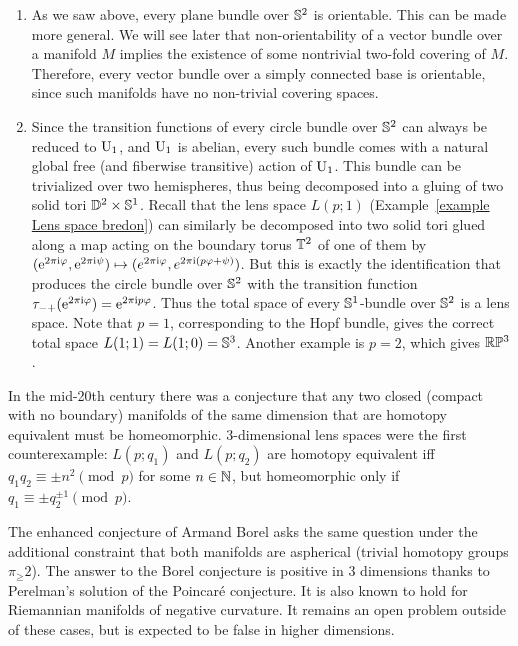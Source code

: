 \begin{example}\label{ex circle bundles over S2}
     \begin{enumerate}
        \item As we saw above, every plane bundle over $\mathbb{S}^2$ is orientable. This can be made more general. We will see later that non-orientability of a vector bundle over a manifold $M$ implies the existence of some nontrivial two-fold covering of $M$. Therefore, every vector bundle over a simply connected base is orientable, since such manifolds have no non-trivial covering spaces.
        
        \item Since the transition functions of every circle bundle over $\mathbb{S}^2$ can always be reduced to $\operatorname{U}_1$, and $\operatorname{U}_1$ is abelian, every such bundle comes with a natural global free (and fiberwise transitive) action of $\operatorname{U}_1$. This bundle can be trivialized over two hemispheres, thus being decomposed into a gluing of two solid tori $\mathbb{D}^2\times \mathbb{S}^1$. Recall that the lens space $L(p;1)$ (Example~\ref{example Lens space bredon}) can similarly be decomposed into two solid tori glued along a map acting on the boundary torus $\mathbb{T}^2$ of one of them by $(\mathrm{e}^{2\pi\mathrm{i} \varphi},\mathrm{e}^{2\pi\mathrm{i}\psi})\mapsto (e^{2\pi\mathrm{i}\varphi},e^{2\pi\mathrm{i}(p\varphi+\psi)})$. But this is exactly the identification that produces the circle bundle over $\mathbb{S}^2$ with the transition function $\tau_{-+}(\mathrm{e}^{2\pi\mathrm{i}\varphi})=\mathrm{e}^{2\pi\mathrm{i} p\varphi}$. Thus the total space of every $\mathbb{S}^1$-bundle over $\mathbb{S}^2$ is a lens space. Note that $p=1$, corresponding to the Hopf bundle, gives the correct total space $L(1;1)=L(1;0)=\mathbb{S}^3$. Another example is $p=2$, which gives $\mathbb{R}\mathbb{P}^3$. 
    \end{enumerate}
\end{example}
   
\begin{rem}
    In the mid-20th century there was a conjecture that any two closed (compact with no boundary) manifolds of the same dimension that are homotopy equivalent must be homeomorphic. 3-dimensional lens spaces were the first counterexample: $L(p;q_1)$ and $L(p;q_2)$ are homotopy equivalent iff $q_1q_2\equiv \pm n^2\pmod{p}$ for some $n\in\mathbb{N}$, but homeomorphic only if $q_1\equiv \pm q_2^{\pm 1}\pmod{p}$.

    The enhanced conjecture of Armand Borel asks the same question under the additional constraint that both manifolds are aspherical (trivial homotopy groups $\pi_\geq 2$). The answer to the Borel conjecture is positive in 3 dimensions thanks to Perelman's solution of the Poincar\'e conjecture. It is also known to hold for Riemannian manifolds of negative curvature. It remains an open problem outside of these cases, but is expected to be false in higher dimensions.
\end{rem}


